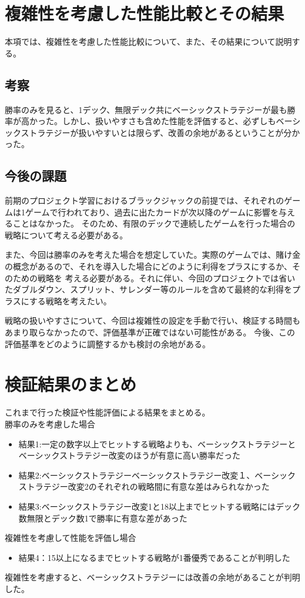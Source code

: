 \section{複雑性を考慮した性能比較とその結果}

本項では、複雑性を考慮した性能比較について、また、その結果について説明する。

\subsection{考察}

勝率のみを見ると、1デック、無限デック共にベーシックストラテジーが最も勝率が高かった。しかし、扱いやすさも含めた性能を評価すると、必ずしもベーシックストラテジーが扱いやすいとは限らず、改善の余地があるということが分かった。


\subsection{今後の課題}

前期のプロジェクト学習におけるブラックジャックの前提では、それぞれのゲームは1ゲームで行われており、過去に出たカードが次以降のゲームに影響を与えることはなかった。
そのため、有限のデックで連続したゲームを行った場合の戦略について考える必要がある。

また、今回は勝率のみを考えた場合を想定していた。実際のゲームでは、賭け金の概念があるので、それを導入した場合にどのように利得をプラスにするか、そのための戦略を
考える必要がある。それに伴い、今回のプロジェクトでは省いたダブルダウン、スプリット、サレンダー等のルールを含めて最終的な利得をプラスにする戦略を考えたい。

戦略の扱いやすさについて、今回は複雑性の設定を手動で行い、検証する時間もあまり取らなかったので、評価基準が正確ではない可能性がある。
今後、この評価基準をどのように調整するかも検討の余地がある。


\section{検証結果のまとめ}
これまで行った検証や性能評価による結果をまとめる。\\
勝率のみを考慮した場合
\begin{itemize}
\item 結果1:一定の数字以上でヒットする戦略よりも、ベーシックストラテジーとベーシックストラテジー改変のほうが有意に高い勝率だった
\item 結果2:ベーシックストラテジーベーシックストラテジー改変１、ベーシックストラテジー改変2のそれぞれの戦略間に有意な差はみられなかった
\item 結果3:ベーシックストラテジー改変1と18以上までヒットする戦略にはデック数無限とデック数1で勝率に有意な差があった
\end{itemize}
複雑性を考慮して性能を評価し場合
\begin{itemize}
\item 結果4：15以上になるまでヒットする戦略が1番優秀であることが判明した
\end{itemize}
複雑性を考慮すると、ベーシックストラテジーには改善の余地があることが判明した。